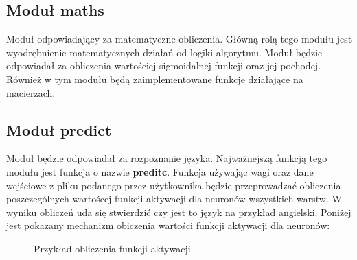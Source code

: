 \documentclass[8pt]{article}
\begin{document}
\subsection{Moduł maths}
\hspace*{1 cm} Moduł odpowiadający za matematyczne obliczenia. Główną rolą tego modułu jest wyodrębnienie matematycznych działań od logiki algorytmu. Moduł będzie odpowiadał za obliczenia wartościej sigmoidalnej funkcji oraz jej pochodej. Również w tym modułu będą zaimplementowane funkcje działające na macierzach.  
\subsection{Moduł predict}
\hspace{1 cm}Moduł będzie odpowiadał za rozpoznanie języka. Najważnejszą funkcją tego modułu jest funkcja o nazwie \textbf{preditc}. Funkcja używając wagi oraz dane wejściowe z pliku podanego przez użytkownika będzie przeprowadzać obliczenia poszczególnych wartoścej funkcji aktywacji dla neuronów wszystkich warstw. W wyniku obliczeń uda się stwierdzić czy jest to język na przykład angielski. Poniżej jest pokazany mechanizm obiczenia wartości funkcji aktywacji dla neuronów:
\begin{figure}[h!]
\caption{Przykład obliczenia funkcji aktywacji}
\label{fig:image}
\end{figure}\newpage
\end{document}
